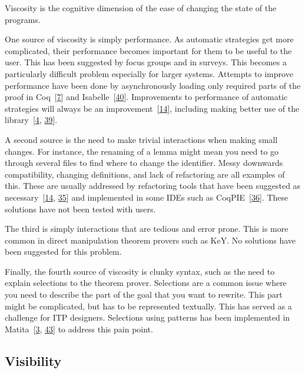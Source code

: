 \documentclass[
]{article}
\begin{document}
Viscosity is the cognitive dimension of the ease of changing the state
of the programs.

One source of viscosity is simply performance. As automatic strategies
get more complicated, their performance becomes important for them to be
useful to the user. This has been suggested by focus groups and in
surveys. This becomes a particularly difficult problem especially for
larger systems. Attempts to improve performance have been done by
asynchronously loading only required parts of the proof in
Coq~{[}\protect\hyperlink{ref-barras_asynchronous_2015}{7}{]} and
Isabelle~{[}\protect\hyperlink{ref-wenzel_asynchronous_2014}{40}{]}.
Improvements to performance of automatic strategies will always be an
improvement~{[}\protect\hyperlink{ref-bourke_challenges_2012}{14}{]},
including making better use of the
library~{[}\protect\hyperlink{ref-asperti_considerations_2010}{4},
\protect\hyperlink{ref-tassi_interactive_2008}{39}{]}.

A second source is the need to make trivial interactions when making
small changes. For instance, the renaming of a lemma might mean you need
to go through several files to find where to change the identifier.
Messy downwards compatibility, changing definitions, and lack of
refactoring are all examples of this. These are usually addressed by
refactoring tools that have been suggested as
necessary~{[}\protect\hyperlink{ref-bourke_challenges_2012}{14},
\protect\hyperlink{ref-ringer_replica_2020}{35}{]} and implemented in
some IDEs such as
CoqPIE~{[}\protect\hyperlink{ref-roe_coqpie_2016}{36}{]}. These
solutions have not been tested with users.

The third is simply interactions that are tedious and error prone. This
is more common in direct manipulation theorem provers such as KeY. No
solutions have been suggested for this problem.

Finally, the fourth source of viscosity is clunky syntax, such as the
need to explain selections to the theorem prover. Selections are a
common issue where you need to describe the part of the goal that you
want to rewrite. This part might be complicated, but has to be
represented textually. This has served as a challenge for ITP designers.
Selections using patterns has been implemented in
Matita~{[}\protect\hyperlink{ref-asperti_user_2007}{3},
\protect\hyperlink{ref-zacchiroli_user_2007}{43}{]} to address this pain
point.

\hypertarget{visibility}{%
\subsection{Visibility}\label{visibility}}
\end{document}
